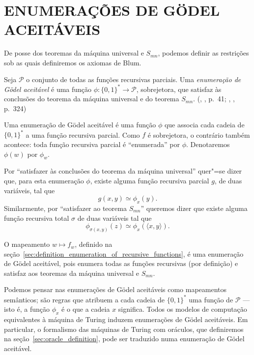 \section{ENUMERAÇÕES DE GÖDEL ACEITÁVEIS}
\label{sec:acceptable_godel_numbering}

De posse dos teoremas da máquina universal e $S_{mn}$,
podemos definir as restrições sob as quais definiremos os axiomas de Blum.

\begin{definition}
    Seja $\mathcal P$ o conjunto de todas as funções recursivas parciais.
    Uma \emph{enumeração de Gödel aceitável}
    é uma função $\phi: \{0, 1\}^* \to \mathcal P$, sobrejetora,
    que satisfaz às conclusões do teorema da máquina universal
    e do teorema $S_{mn}$.
    (\citeauthor{Rogers1987}, \citeyear{Rogers1987}, p.~41;
    \citeauthor{Blum1967}, \citeyear{Blum1967}, p.~324)
\end{definition}

Uma enumeração de Gödel aceitável é uma função $\phi$ que associa
cada cadeia de $\{0, 1\}^*$ a uma função recursiva parcial.
Como $f$ é sobrejetora,
o contrário também acontece:
toda função recursiva parcial é ``enumerada'' por $\phi$.
Denotaremos $\phi(w)$ por $\phi_w$.

Por ``satisfazer às conclusões do teorema da máquina universal''
quer"=se dizer que,
para esta enumeração $\phi$,
existe alguma função recursiva parcial $g$, de duas variáveis,
tal que
\begin{equation*}
    g(x, y) \simeq \phi_x(y).
\end{equation*}
Similarmente, por ``satisfazer ao teorema $S_{mn}$'' queremos dizer que
existe alguma função recursiva total $\sigma$ de duas variáveis tal que
\begin{equation*}
    \phi_{\sigma(x, y)}(z) \simeq \phi_x(\langle x, y \rangle).
\end{equation*}

\begin{example}
    O mapeamento $w \mapsto f_w$,
    definido na seção~\ref{sec:definition_enumeration_of_recursive_functions},
    é uma enumeração de Gödel aceitável,
    pois enumera todas as funções recursivas (por definição)
    e satisfaz aos teoremas da máquina universal e $S_{mn}$.
\end{example}

Podemos pensar nas enumerações de Gödel aceitáveis
como mapeamentos semânticos;
são regras que atribuem a cada cadeia de $\{0, 1\}^*$
uma função de $\mathcal P$ --- isto é,
a função $\phi_x$ é o que a cadeia $x$ significa.
Todos os modelos de computação equivalentes à máquina de Turing
induzem enumerações de Gödel aceitáveis.
Em particular,
o formalismo das máquinas de Turing com oráculos,
que definiremos na seção~\ref{sec:oracle_definition},
pode ser traduzido numa enumeração de Gödel aceitável.

